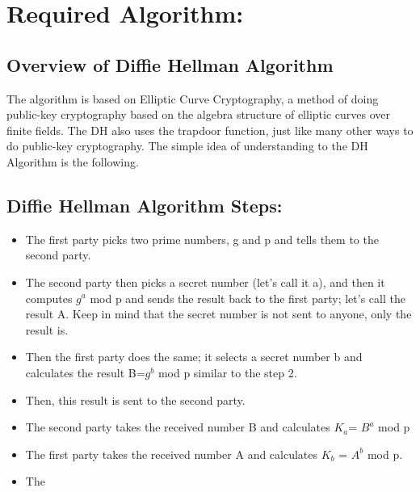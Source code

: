 \section{Required Algorithm:}

\subsection{Overview of  Diffie Hellman Algorithm}
The algorithm is based on Elliptic Curve Cryptography, a method of doing public-key cryptography based on the algebra structure of elliptic curves over finite fields. The DH also uses the trapdoor function, just like many other ways to do public-key cryptography. The simple idea of understanding to the DH Algorithm is the following.

\subsection{Diffie Hellman Algorithm Steps:}
\vspace{-18pt}
\begin{itemize}
	\item The first party picks two prime numbers, g and p and tells them to the second party.
	\item The second party then picks a secret number (let’s call it a), and then it computes $g^a$ mod p and sends the result back to the first party; let’s call the result A. Keep in mind that the secret number is not sent to anyone, only the result is.
	\item Then the first party does the same; it selects a secret number b and calculates the result B=$g^b$ mod p similar to the step 2.
	\item Then, this result is sent to the second party.
	\item  The second party takes the received number B and calculates $K_{a}$= $B^a$ mod p
	\item The first party takes the received number A and calculates $K_{b}$ = $A^b$ mod p.
	\item The
\end{itemize}
